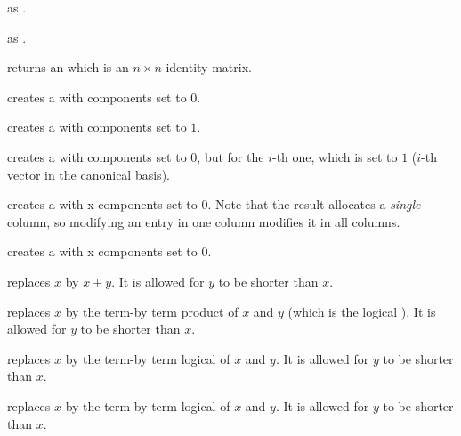  as .

 as .

 returns an  which is an $n \times n$
identity matrix.

 creates a  with  components set to
$0$.

 creates a  with  components set to
$1$.

 creates a  with  components
set to $0$, but for the $i$-th one, which is set to $1$ ($i$-th vector in the
canonical basis).

 creates a  with  x 
components set to $0$. Note that the result allocates a
\emph{single} column, so modifying an entry in one column modifies it in
all columns.

 creates a  with  x
 components set to $0$.











 replaces $x$ by $x+y$. It is
allowed for $y$ to be shorter than $x$.

 replaces $x$ by the term-by term product
of $x$ and $y$ (which is the logical ). It is allowed for $y$ to be
shorter than $x$.

 replaces $x$ by the term-by term
logical  of $x$ and $y$. It is allowed for $y$ to be
shorter than $x$.

 replaces $x$ by the term-by term
logical  of $x$ and $y$. It is allowed for $y$ to be
shorter than $x$.

